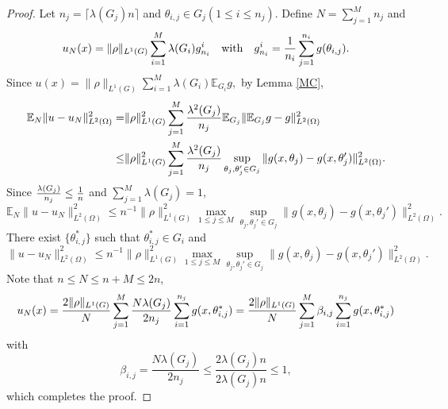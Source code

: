 \begin{proof}
Let $n_j=\lceil \lambda(G_j)n\rceil$ and $\theta_{i,j} \in G_j(1\leq i\leq n_j)$. Define $\displaystyle N=\sum_{j=1}^M n_j$ and
$$
u_N(x)=\|\rho\|_{L^1(G)}\sum_{i=1}^M \lambda(G_i)g_{n_i}^i \quad \mbox{with}\quad g_{n_i}^i={1 \over n_i}\sum_{j=1}^{n_i} g(\theta_{i,j}).
$$
Since
$
\displaystyle u(x)=\|\rho\|_{L^1(G)}\sum_{i=1}^M \lambda(G_i)\mathbb{E}_{G_i} g,
$
by Lemma \ref{MC},
\begin{equation}
\begin{split}
\mathbb{E}_N\|u- u_N \|_{L^2(\Omega)}^2=& \|\rho\|_{L^1(G)}^2
 \sum_{j=1}^{M}{\lambda^2(G_j) \over n_j}\mathbb{E}_{G_j}\|\mathbb{E}_{G_j} g -  g\|^2_{L^2(\Omega)}
\\
\le &\|\rho\|_{L^1(G)}^2 \sum_{j=1}^{M} {\lambda^2(G_j)\over n_j}\sup_{\theta_{j},\theta_{j}'\in G_j} \| g(x,\theta_j) - g(x,\theta_j')\|^2_{L^2(\Omega)}.
\end{split}
\end{equation} 
Since ${\lambda(G_j)\over n_j}\le {1\over n}$ and $\displaystyle \sum_{j=1}^M \lambda(G_j)=1$,
\begin{equation}
\mathbb{E}_N\|u - u_N \|_{L^2(\Omega)}^2\leq n^{-1}\|\rho\|_{L^1(G)}^2\max_{1\le j\le M}\sup_{\theta_{j},\theta_{j}'\in G_j} \| g(x,\theta_j) - g(x,\theta_j')\|^2_{L^2(\Omega)}.
\end{equation}
There exist $\{\theta_{i,j}^\ast\}$ such that $\theta_{i,j}^\ast\in G_i$ and 
\begin{equation}
\| u-u_N \|_{L^2(\Omega)}^2\leq n^{-1} \|\rho\|_{L^1(G)}^2\max_{1\le j\le M}\sup_{\theta_{j},\theta_{j}'\in G_j} \| g(x,\theta_j) - g(x,\theta_j')\|^2_{L^2(\Omega)}.
\end{equation}
Note that $n\le N\le n+M\le 2n$,
$$
u_N(x) =  {2\|\rho\|_{L^1(G)}\over N}\sum_{j=1}^{M}\frac{N\lambda(G_j)}{2n_j}\sum_{i=1}^{n_j} g(x,\theta_{i,j}^\ast)
 =  {2\|\rho\|_{L^1(G)}\over N}\sum_{j=1}^{M}\beta_{i,j}\sum_{i=1}^{n_j} g(x,\theta_{i,j}^\ast)
$$ 
with
\begin{equation}
\beta_{i,j}= \frac{N\lambda(G_j)}{2n_j}\le \frac{2\lambda(G_j)n}{2\lambda(G_j)n}\le 1,
\end{equation}
which completes the proof. 
\end{proof} 


